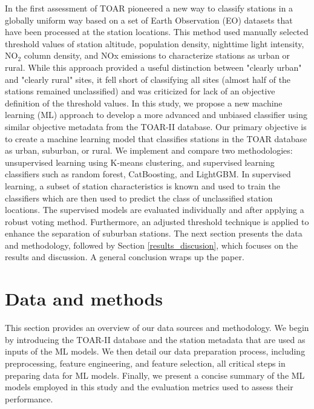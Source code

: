 \documentclass[gmd, manuscript]{copernicus}
\begin{document}
In the first assessment of TOAR \cite{schultz2017tropospheric} pioneered a new way to classify stations in a globally uniform way based on a set of Earth Observation (EO) datasets that have been processed at the station locations. This method used manually selected threshold values of station altitude, population density, nighttime light intensity, NO$_2$ column density, and NOx emissions to characterize stations as urban or rural. While this approach provided a useful distinction between "clearly urban" and "clearly rural" sites, it fell short of classifying all sites (almost half of the stations remained unclassified) and was criticized for lack of an objective definition of the threshold values. In this study, we propose a new machine learning (ML) approach to develop a more advanced and unbiased classifier using similar objective metadata from the TOAR-II database. Our primary objective is to create a machine learning model that classifies stations in the TOAR database as urban, suburban, or rural.
We implement and compare two methodologies: unsupervised learning using K-means clustering, %
and supervised learning classifiers such as random forest, CatBoosting, and LightGBM. In supervised learning, a subset of station characteristics is known and used to train the classifiers which are then used to predict the class of unclassified station locations. The supervised models are evaluated individually and after applying a robust voting method. Furthermore, an adjusted threshold technique is applied to enhance the separation of suburban stations.
The next section presents the data and methodology, followed by Section \ref{results_discusion}, which focuses on the results and discussion. A general conclusion wraps up the paper.


\section{Data and methods}\label{data_method}
This section provides an overview of our data sources and methodology. We begin by introducing the TOAR-II database and the station metadata that are used as inputs of the ML models. We then detail our data preparation process, including preprocessing, feature engineering, and feature selection, all critical steps in preparing data for ML models. Finally, we present a concise summary of the ML models employed in this study and the evaluation metrics used to assess their performance.
\end{document}
